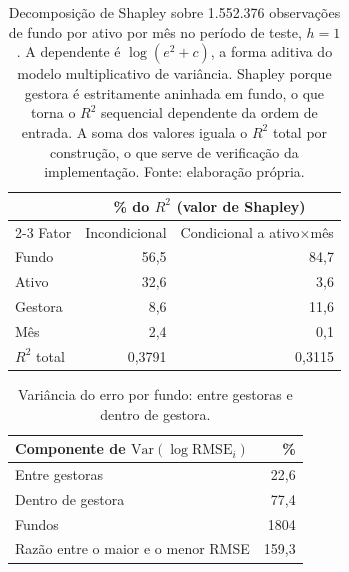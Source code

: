 
\begin{table}[h]\centering\small
\caption{Onde está a variação do erro de previsão fora da amostra.}
\label{tab:ext-onde-variancia}
\begin{tabular}{@{}lrr@{}}
\toprule
& \multicolumn{2}{c}{\% do $R^2$ (valor de Shapley)} \\ \cmidrule(l){2-3}
Fator & Incondicional & Condicional a ativo$\times$mês \\
\midrule
Fundo & 56,5 & 84,7 \\
Ativo & 32,6 & 3,6 \\
Gestora & 8,6 & 11,6 \\
Mês & 2,4 & 0,1 \\
\midrule
$R^2$ total & 0,3791 & 0,3115 \\
\bottomrule
\end{tabular}
\caption*{\footnotesize Decomposição de Shapley sobre 1.552.376 observações de fundo por ativo por mês no período de teste, $h=1$. A dependente é $\log(e^2+c)$, a forma aditiva do modelo multiplicativo de variância. Shapley porque gestora é estritamente aninhada em fundo, o que torna o $R^2$ sequencial dependente da ordem de entrada. A soma dos valores iguala o $R^2$ total por construção, o que serve de verificação da implementação. Fonte: elaboração própria.}
\end{table}

\begin{table}[h]\centering\small
\caption{Variância do erro por fundo: entre gestoras e dentro de gestora.}
\label{tab:ext-entre-dentro}
\begin{tabular}{@{}lr@{}}
\toprule
Componente de $\mathrm{Var}(\log \mathrm{RMSE}_i)$ & \% \\
\midrule
Entre gestoras & 22,6 \\
Dentro de gestora & 77,4 \\
\midrule
Fundos & 1804 \\
Razão entre o maior e o menor RMSE & 159,3 \\
\bottomrule
\end{tabular}
\end{table}

